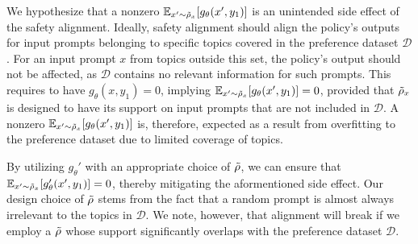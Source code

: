 We hypothesize that a nonzero $\mathbb{E}_{x' \sim \tilde{\rho}_x}[g_\theta(x', y_1)]$ is an unintended side effect of the safety alignment. Ideally, safety alignment should align the policy's outputs for input prompts belonging to specific topics covered in the preference dataset $\mathcal{D}$. For an input prompt $x$ from topics outside this set, the policy's output should not be affected, as $\mathcal{D}$ contains no relevant information for such prompts. This requires to have $g_\theta(x, y_1) = 0$, implying $\mathbb{E}_{x' \sim \tilde{\rho}_x}[g_\theta(x', y_1)] = 0$, provided that $\tilde{\rho}_x$ is designed to have its support on input prompts that are not included in $\mathcal{D}$. A nonzero $\mathbb{E}_{x' \sim \tilde{\rho}_x}[g_\theta(x', y_1)]$ is, therefore, expected as a result from overfitting to the preference dataset due to limited coverage of topics.

By utilizing $g_{\theta}'$ with an appropriate choice of $\tilde{\rho}$, we can ensure that $\mathbb{E}_{x' \sim \tilde{\rho}_x}[g_{\theta}'(x', y_1)] = 0$, thereby mitigating the aformentioned side effect.
Our design choice of $\tilde{\rho}$ stems from the fact that a random prompt is almost always irrelevant to the topics in $\mathcal{D}$. We note, however, that alignment will break if we employ a $\tilde{\rho}$ whose support significantly overlaps with the preference dataset $\mathcal{D}$.
